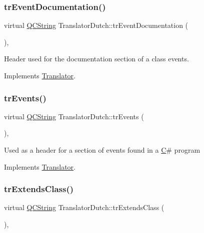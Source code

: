 \mbox{\label{class_translator_dutch_a2a1390c102e41e741718f917eea9b707}} 
\subsubsection{\texorpdfstring{trEventDocumentation()}{trEventDocumentation()}}
{\footnotesize\ttfamily virtual \mbox{\hyperlink{class_q_c_string}{Q\+C\+String}} Translator\+Dutch\+::tr\+Event\+Documentation (\begin{DoxyParamCaption}{ }\end{DoxyParamCaption})\hspace{0.3cm}{\ttfamily [inline]}, {\ttfamily [virtual]}}

Header used for the documentation section of a class\textquotesingle{} events. 

Implements \mbox{\hyperlink{class_translator}{Translator}}.

\mbox{\label{class_translator_dutch_a8b353e3faef70a92c08a0ffaa64aaf8e}} 
\subsubsection{\texorpdfstring{trEvents()}{trEvents()}}
{\footnotesize\ttfamily virtual \mbox{\hyperlink{class_q_c_string}{Q\+C\+String}} Translator\+Dutch\+::tr\+Events (\begin{DoxyParamCaption}{ }\end{DoxyParamCaption})\hspace{0.3cm}{\ttfamily [inline]}, {\ttfamily [virtual]}}

Used as a header for a section of events found in a \mbox{\hyperlink{class_c}{C}}\# program 

Implements \mbox{\hyperlink{class_translator}{Translator}}.

\mbox{\label{class_translator_dutch_ad6c339e700baa233aa1ced07c4b1ede2}} 
\subsubsection{\texorpdfstring{trExtendsClass()}{trExtendsClass()}}
{\footnotesize\ttfamily virtual \mbox{\hyperlink{class_q_c_string}{Q\+C\+String}} Translator\+Dutch\+::tr\+Extends\+Class (\begin{DoxyParamCaption}{ }\end{DoxyParamCaption})\hspace{0.3cm}{\ttfamily [inline]}, {\ttfamily [virtual]}}

